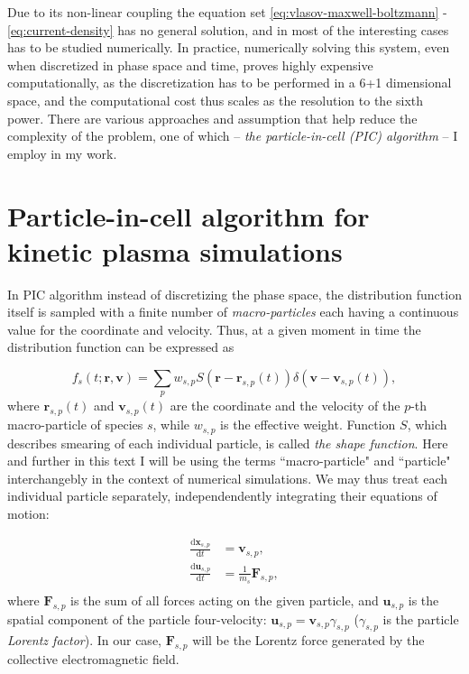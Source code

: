Due to its non-linear coupling the equation set \eqref{eq:vlasov-maxwell-boltzmann} - \eqref{eq:current-density} has no general solution, and in most of the interesting cases has to be studied numerically. In practice, numerically solving this system, even when discretized in phase space and time, proves highly expensive computationally, as the discretization has to be performed in a 6+1 dimensional space, and the computational cost thus scales as the resolution to the sixth power. There are various approaches and assumption that help reduce the complexity of the problem, one of which -- \emph{the particle-in-cell (PIC) algorithm} -- I employ in my work.

\section{Particle-in-cell algorithm for kinetic plasma simulations}
\label{sec:pic}

In PIC algorithm \citep{1986ITPS...14..661B, 1991ppcs.book.....B} instead of discretizing the phase space, the distribution function itself is sampled with a finite number of \emph{macro-particles} each having a continuous value for the coordinate and velocity. Thus, at a given moment in time the distribution function can be expressed as

\begin{equation}
  \label{eq:pic-df}
  f_s(t;\bm{r},\bm{v}) = \sum_p w_{s,p}S\left(\bm{r} - \bm{r}_{s,p}(t)\right)\delta\left(\bm{v}-\bm{v}_{s,p}(t)\right),
\end{equation}
\noindent where $\bm{r}_{s,p}(t)$ and $\bm{v}_{s,p}(t)$ are the coordinate and the velocity of the $p$-th macro-particle of species $s$, while $w_{s,p}$ is the effective weight. Function $S$, which describes smearing of each individual particle, is called \emph{the shape function}. Here and further in this text I will be using the terms ``macro-particle" and ``particle" interchangebly in the context of numerical simulations. We may thus treat each individual particle separately, independendently integrating their equations of motion:

\begin{equation}
  \label{eq:eom}
\begin{aligned}
  \frac{\mathrm{d}\bm{x}_{s,p}}{\mathrm{d}t} &= \bm{v}_{s,p},\\
  \frac{\mathrm{d}\bm{u}_{s,p}}{\mathrm{d}t} &= \frac{1}{m_s}\bm{F}_{s,p},\\
\end{aligned}
\end{equation}
\noindent where $\bm{F}_{s,p}$ is the sum of all forces acting on the given particle, and $\bm{u}_{s,p}$ is the spatial component of the particle four-velocity: $\bm{u}_{s,p} = \bm{v}_{s,p}\gamma_{s,p}$ ($\gamma_{s,p}$ is the particle \emph{Lorentz factor}). In our case, $\bm{F}_{s,p}$ will be the Lorentz force generated by the collective electromagnetic field.

